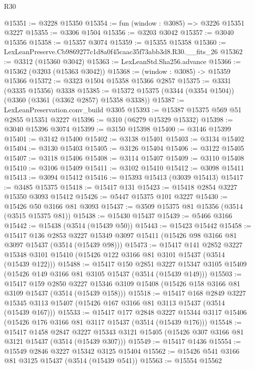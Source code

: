 \begin{lexlean}{R30}
\begin{coremodule}
@15351 := @3228 @15350
@15354 := fun (window : @3085) => @3226 @15351 @3227
@15355 := @3306 @1504
@15356 := @3203 @3042
@15357 := @3040 @15356
@15358 := @15357 @3074
@15359 := @15355 @15358
@15360 := LexLeanPreserve.Cb9869277c1d8a0f45caac35f73abb3d8.R30.__fits_26
@15362 := @3312 (@15360 @3042)
@15363 := LexLeanStd.Sha256.advance
@15366 := @15362 (@3203 (@15363 @3042))
@15368 := (window : @3085) -> @15359 @15366
@15372 := @3323 @1504 @15358 @15366 @2857
@15375 := @3331 (@3335 @15356) @3338
@15385 := @15372 @15375 (@3344 (@3354 @1504)) (@3360 (@3361 (@3362 @2857) @15358 @3338))
@15387 := LexLeanPreservation.conv_build @3305
@15393 := @15387 @15375 @569 @51 @2855 @15351 @3227
@15396 := @310 (@6279 @15329 @15332)
@15398 := @3040 @15396 @3074
@15399 := @3150 @15398
@15400 := @3146 @15399
@15401 := @3142 @15400
@15402 := @3138 @15401
@15403 := @3134 @15402
@15404 := @3130 @15403
@15405 := @3126 @15404
@15406 := @3122 @15405
@15407 := @3118 @15406
@15408 := @3114 @15407
@15409 := @3110 @15408
@15410 := @3106 @15409
@15411 := @3102 @15410
@15412 := @3098 @15411
@15413 := @3094 @15412
@15416 := @15393 @15413 (@3039 @15413)
@15417 := @3485 @15375
@15418 := @15417 @131
@15423 := @15418 @2854 @3227 @15350 @3093 @15412
@15426 := @5447 @15375 @101 @3227
@15430 := @15426 @50 @3166 @81 @3093
@15437 := @3509 @15375 @81 @15356 (@3514 (@3515 @15375 @81))
@15438 := @15430 @15437
@15439 := @5466 @3166
@15442 := @15438 (@3514 (@15439 @50))
@15443 := @15423 @15442
@15458 := @15417
    @136
    @2853
    @3227
    @15349
    @3097
    @15411
    (@15426 @98 @3166 @81 @3097 @15437 (@3514 (@15439 @98)))
@15473 := @15417
    @141
    @2852
    @3227
    @15348
    @3101
    @15410
    (@15426 @122 @3166 @81 @3101 @15437 (@3514 (@15439 @122)))
@15488 := @15417
    @150
    @2851
    @3227
    @15347
    @3105
    @15409
    (@15426 @149 @3166 @81 @3105 @15437 (@3514 (@15439 @149)))
@15503 := @15417
    @159
    @2850
    @3227
    @15346
    @3109
    @15408
    (@15426 @158 @3166 @81 @3109 @15437 (@3514 (@15439 @158)))
@15518 := @15417
    @168
    @2849
    @3227
    @15345
    @3113
    @15407
    (@15426 @167 @3166 @81 @3113 @15437 (@3514 (@15439 @167)))
@15533 := @15417
    @177
    @2848
    @3227
    @15344
    @3117
    @15406
    (@15426 @176 @3166 @81 @3117 @15437 (@3514 (@15439 @176)))
@15548 := @15417
    @1458
    @2847
    @3227
    @15343
    @3121
    @15405
    (@15426 @307 @3166 @81 @3121 @15437 (@3514 (@15439 @307)))
@15549 := @15417 @1436
@15554 := @15549 @2846 @3227 @15342 @3125 @15404
@15562 := @15426 @541 @3166 @81 @3125 @15437 (@3514 (@15439 @541))
@15563 := @15554 @15562

\end{coremodule}
\end{lexlean}
